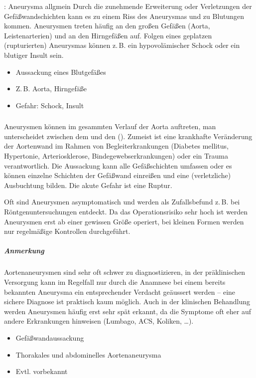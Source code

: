 \Text
{{\TxBeschreibung}: Aneurysma allgmein}
{%
Durch die
zunehmende Erweiterung oder Verletzungen der
Gefäßwandschichten kann es zu einem Riss des Aneurysmas und
zu Blutungen kommen. Aneurysmen treten häufig an den großen
Gefäßen (Aorta, Leistenarterien) und an den Hirngefäßen auf.
Folgen eines geplatzen (rupturierten) Aneurysmas können
z.\,B. ein hypovolämischer Schock oder ein blutiger Insult
sein.}
{
\begin{itemize}
  \item Aussackung eines Blutgefäßes
  \item Z.\,B. Aorta, Hirngefäße
  \item Gefahr: Schock, Insult
\end{itemize}
}
{}
{}
{}

\subsubsection{}

\label{topic:thoraxaortenaneurysma}
\label{topic:bauchaortenaneurysma}
\nocite{Meron2004}

{%
Aneurysmen können im gesammten Verlauf der Aorta auftreten, man unterscheidet
zwischen dem  und
den  ().  Zumeist
ist eine krankhafte Veränderung der Aortenwand im
Rahmen von Begleiterkrankungen (Diabetes mellitus, Hypertonie,
Arteriosklerose,
Bindegewebserkrankungen) oder ein Trauma
verantwortlich. Die Aussackung kann alle Gefäßschichten
umfassen oder es können einzelne Schichten der
Gefäßwand einreißen und eine (verletzliche) Ausbuchtung
bilden. 
Die akute Gefahr ist eine
Ruptur. 

Oft sind Aneurysmen asymptomatisch und werden als
Zufallsbefund z.\,B. bei Röntgenuntersuchungen entdeckt. Da
das Operationsrisiko sehr hoch ist werden Aneurysmen erst ab
einer gewissen Größe operiert, bei kleinen Formen werden nur
regelmäßige Kontrollen durchgeführt.

\subparagraph{Anmerkung} Aortenaneurysmen sind sehr oft
schwer zu diagnostizieren, in der präklinischen Versorgung
kann im Regelfall nur durch die Anamnese bei einem bereits
bekannten Aneurysma ein entsprechender Verdacht geäussert
werden -- eine sichere Diagnose ist praktisch kaum möglich.
Auch in der klinischen Behandlung werden Aneurysmen häufig
erst sehr spät erkannt, da die Symptome oft eher auf andere
Erkrankungen hinweisen (Lumbago, ACS, Koliken, \ldots). 

}
{%
\begin{itemize}
  \item Gefäßwandaussackung
  \item Thorakales und abdominelles Aortenaneurysma
  \item Evtl. vorbekannt
\end{itemize}
}{}{}{}

